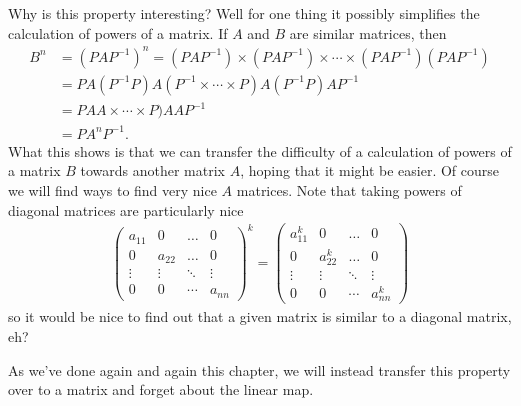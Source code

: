 Why is this property interesting? Well for one thing it possibly simplifies the calculation of powers of a matrix. If $A$ and $B$ are similar matrices, then
\begin{align*}
B^n &= (P A P^{-1})^n = (P A P^{-1})\times (P A P^{-1})\times  \cdots \times (P A P^{-1})(P A P^{-1}) \\
&=  P A (P^{-1}P) A (P^{-1}\times  \cdots \times P) A( P^{-1} P) A P^{-1} \\
&=  P A A \times  \cdots \times P) A A P^{-1} \\
&=  P A^n P^{-1}.
\end{align*}
What this shows is that we can transfer the difficulty of a calculation of powers of a matrix $B$ towards another matrix $A$, hoping that it might be easier. Of course we will find ways to find very nice $A$ matrices. Note that taking powers of diagonal matrices are particularly nice
\begin{align*}
\begin{pmatrix}
 a_{11} &   0    & \dots  &   0 \\
   0    & a_{22} & \dots  &   0 \\
 \vdots & \vdots & \ddots & \vdots \\
   0    &   0    & \cdots & a_{nn}
\end{pmatrix}^k
=
\begin{pmatrix}
 a_{11}^k &   0    & \dots  &   0 \\
   0    & a_{22}^k & \dots  &   0 \\
 \vdots & \vdots & \ddots & \vdots \\
   0    &   0    & \cdots & a_{nn}^k
\end{pmatrix}
\end{align*}
so it would be nice to find out that a given matrix is similar to a diagonal matrix, eh?



\noindent As we've done again and again this chapter, we will instead transfer this property over to a matrix and forget about the linear map.




